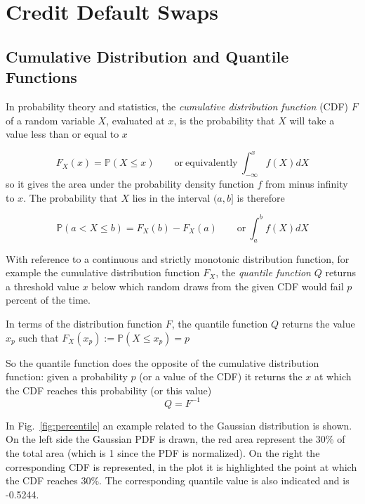 \chapter{Credit Default Swaps}

\section{Cumulative Distribution and Quantile Functions}\label{quantile-function}

In probability theory and statistics, the \emph{cumulative distribution function} (CDF) \(F\) of a random variable \(X\), evaluated at \(x\), is the probability that \(X\) will take a value less than or equal to \(x\)

\[F_X(x) = \mathbb{P}(X \le x)\qquad\mathrm{or~equivalently}~\int_{-\infty}^{x}{f(X)dX}\]
so it gives the area under the probability density function \(f\) from
minus infinity to \(x\).
The probability that \(X\) lies in the interval \((a,b]\) is therefore

\[\mathbb{P}(a\lt X \le b)=F_{X}(b)-F_{X}(a)\qquad\mathrm{or}~\int_a^b{f(X)dX}\]

With reference to a continuous and strictly monotonic distribution
function, for example the cumulative distribution function \(F_X\), the
\emph{quantile function} \(Q\) returns a threshold value \(x\) below
which random draws from the given CDF would fail \(p\) percent of the
time.

In terms of the distribution function \(F\), the quantile function \(Q\)
returns the value \(x_p\) such that $F_{X}(x_p):=\mathbb{P}(X\le x_p)=p$

So the quantile function does the opposite of the cumulative
distribution function: given a probability \(p\) (or a value of the CDF)
it returns the \(x\) at which the CDF reaches this probability (or this
value) \[Q=F^{-1}\]

In Fig.~\ref{fig:percentile} an example related to the
Gaussian distribution is shown. On the left side the Gaussian PDF is drawn,
the red area represent the 30\% of the total area (which is 1 since the
PDF is normalized). On the right the corresponding CDF is represented,
in the plot it is highlighted the point at which the CDF reaches
30\%. The corresponding quantile value is also indicated and is -0.5244.

